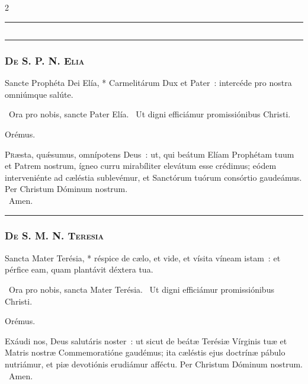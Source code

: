 \documentclass[9pt,twoside]{extarticle}
\begin{document}
\begin{multicols}{2}
\begin{center}\textcolor{red}{\rule{\linewidth}{0.5pt}} \end{center}

\subsection*{\center \textsc{}}
\subsubsection*{\center {}}

\begin{center}\textcolor{red}{\rule{\linewidth}{0.5pt}} \end{center}

\subsubsection*{\center \textsc{De S. P. N. Elia}}
\begin{tightlist}{}
\item {} Sancte Prophéta Dei Elía, * Carmelitárum Dux et Pater~: intercéde pro nostra omniúmque salúte.
\item {}~Ora pro nobis, sancte Pater Elía. ~Ut digni efficiámur promissiónibus Christi.
\item Orémus. \hfill {}
\end{tightlist}
\lettrine{P}ræsta, quǽsumus, omnípotens Deus~: ut, qui beátum Elíam Prophétam tuum et Patrem nostrum, ígneo curru mirabíliter elevátum esse crédimus; eódem interveniénte ad cæléstia sublevémur, et Sanctórum tuórum consórtio gaudeámus. Per Christum Dóminum nostrum.\\ 
~Amen.

\begin{center}\textcolor{red}{\rule{\linewidth}{0.5pt}} \end{center}

\subsubsection*{\center \textsc{De S. M. N. Teresia}}
\begin{tightlist}{}
\item {} Sancta Mater Terésia, * réspice de cælo, et vide, et vísita víneam istam~: et pérfice eam, quam plantávit déxtera tua.
\item {}~Ora pro nobis, sancta Mater Terésia. ~Ut digni efficiámur promissiónibus Christi.
\item Orémus. \hfill {}
\end{tightlist}
\lettrine{E}xáudi nos, Deus salutáris noster~: ut sicut de beátæ Terésiæ Vírginis tuæ et Matris nostræ Commemoratióne gaudémus; ita cæléstis ejus doctrínæ pábulo nutriámur, et piæ devotiónis erudiámur afféctu. Per Christum Dóminum nostrum. ~Amen.


\end{multicols}
\end{document}
